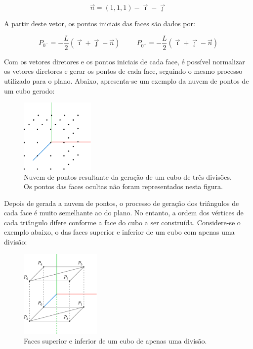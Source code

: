 \documentclass[12pt, a4paper]{article}
\begin{document}
$$
\vec{n} = (1, 1, 1) - \vec{\imath} - \vec{\jmath}
$$

A partir deste vetor, os pontos iniciais das faces são dados por:

$$
P_{0^-} = -\frac{L}{2} \left ( \vec{\imath} + \vec{\jmath} + \vec{n} \right )
\hspace{1cm}
P_{0^+} = -\frac{L}{2} \left ( \vec{\imath} + \vec{\jmath} - \vec{n} \right )
$$

Com os vetores diretores e os pontos iniciais de cada face, é possível normalizar os vetores
diretores e gerar os pontos de cada face, seguindo o mesmo processo utilizado para o plano. Abaixo,
apresenta-se um exemplo da nuvem de pontos de um cubo gerado:

\begin{figure}[H]
    \centering
    \includegraphics[width=0.32\textwidth]{res/figures/CubePoints.pdf}
    \caption{
        \onehalfspacing
        Nuvem de pontos resultante da geração de um cubo de três divisões. Os pontos das faces
        ocultas não foram representados nesta figura.
    }
\end{figure}

Depois de gerada a nuvem de pontos, o processo de geração dos triângulos de cada face é muito
semelhante ao do plano. No entanto, a ordem dos vértices de cada triângulo difere conforme a face do
cubo a ser construída. Considere-se o exemplo abaixo, o das faces superior e inferior de um cubo com
apenas uma divisão:

\begin{figure}[H]
    \centering
    \includegraphics[width=0.35\textwidth]{res/figures/CubeFaces.pdf}
    \caption{Faces superior e inferior de um cubo de apenas uma divisão.}
\end{figure}
\end{document}
